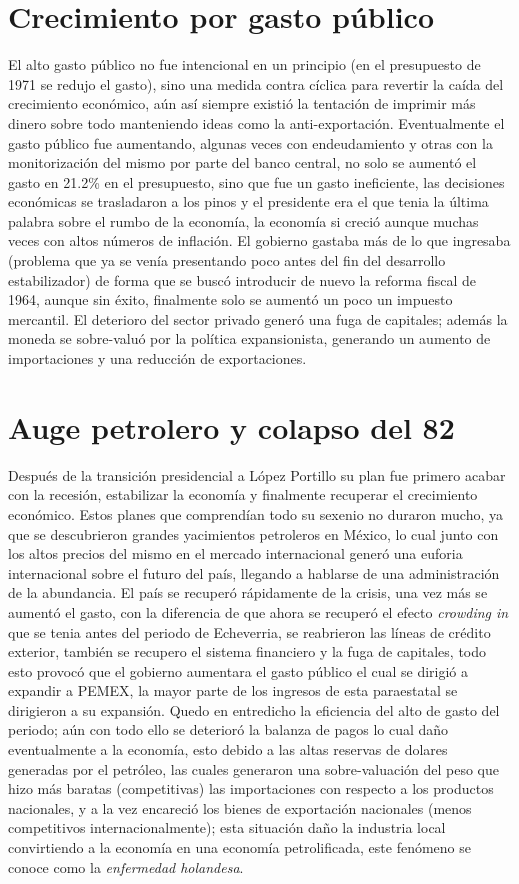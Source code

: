 \section{Crecimiento por gasto público}
El alto gasto público no fue intencional en un principio (en el presupuesto de 1971 se redujo el gasto), sino una medida contra cíclica para revertir la caída del crecimiento económico, aún así siempre existió la tentación de imprimir más dinero sobre todo manteniendo ideas como la anti-exportación. Eventualmente el gasto público fue aumentando, algunas veces con endeudamiento y otras con la monitorización del mismo por parte del banco central, no solo se aumentó el gasto en 21.2\% en el presupuesto, sino que fue un gasto ineficiente, las decisiones económicas se trasladaron a los pinos y el presidente era el que tenia la última palabra sobre el rumbo de la economía, la economía si creció aunque muchas veces con altos números de inflación.
El gobierno gastaba más de lo que ingresaba (problema que ya se venía presentando poco antes del fin del desarrollo estabilizador) de forma que se buscó introducir de nuevo la reforma fiscal de 1964, aunque sin éxito, finalmente solo se aumentó un poco un impuesto mercantil. El deterioro del sector privado generó una fuga de capitales; además la moneda se sobre-valuó por la política expansionista, generando un aumento de importaciones y una reducción de exportaciones.

\section{Auge petrolero y colapso del 82}
Después de la transición presidencial a López Portillo su plan fue primero acabar con la recesión, estabilizar la economía y finalmente recuperar el crecimiento económico. Estos planes que comprendían todo su sexenio no duraron mucho, ya que se descubrieron grandes yacimientos petroleros en México, lo cual junto con los altos precios del mismo en el mercado internacional generó una euforia internacional sobre el futuro del país, llegando a hablarse de una administración de la abundancia.
El país se recuperó rápidamente de la crisis, una vez más se aumentó el gasto, con la diferencia de que ahora se recuperó el efecto \textit{crowding in} que se tenia antes del periodo de Echeverria, se reabrieron las líneas de crédito exterior, también se recupero el sistema financiero y la fuga de capitales, todo esto provocó que el gobierno aumentara el gasto público el cual se dirigió a expandir a PEMEX, la mayor parte de los ingresos de esta paraestatal se dirigieron a su expansión. Quedo en entredicho la eficiencia del alto de gasto del periodo; aún con todo ello se deterioró la balanza de pagos lo cual daño eventualmente a la economía, esto debido a las altas reservas de dolares generadas por el petróleo, las cuales generaron una sobre-valuación del peso que hizo más baratas (competitivas) las importaciones con respecto a los productos nacionales, y a la vez encareció los bienes de exportación nacionales (menos competitivos internacionalmente); esta situación daño la industria local convirtiendo a la economía en una economía petrolificada, este fenómeno se conoce como la \textit{enfermedad holandesa}.

